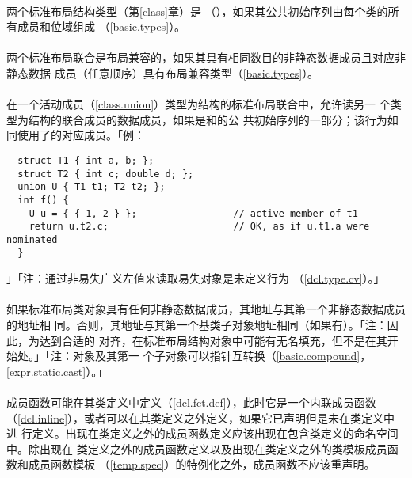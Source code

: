 \paragraph{}
两个标准布局结构类型（第\ref{class}章）是
（），如果其公共初始序列由每个类的所有成员和位域组成
（\ref{basic.types}）。

\paragraph{}
两个标准布局联合是布局兼容的，如果其具有相同数目的非静态数据成员且对应非静态数据
成员（任意顺序）具有布局兼容类型（\ref{basic.types}）。

\paragraph{}
在一个活动成员（\ref{class.union}）类型为结构的标准布局联合中，允许读另一
个类型为结构的联合成员的数据成员，如果是和的公
共初始序列的一部分；该行为如同使用了的对应成员。「例：
\begin{lstlisting}
  struct T1 { int a, b; };
  struct T2 { int c; double d; };
  union U { T1 t1; T2 t2; };
  int f() {
    U u = { { 1, 2 } };                 // active member of t1
    return u.t2.c;                      // OK, as if u.t1.a were nominated
  }
\end{lstlisting}」「注：通过非易失广义左值来读取易失对象是未定义行为
（\ref{dcl.type.cv}）。」

\paragraph{}
如果标准布局类对象具有任何非静态数据成员，其地址与其第一个非静态数据成员的地址相
同。否则，其地址与其第一个基类子对象地址相同（如果有）。「注：因此，为达到合适的
对齐，在标准布局结构对象中可能有无名填充，但不是在其开始处。」「注：对象及其第一
个子对象可以指针互转换（\ref{basic.compound}，\ref{expr.static.cast}）。」

\paragraph{}
成员函数可能在其类定义中定义（\ref{dcl.fct.def}），此时它是一个内联成员函数
（\ref{dcl.inline}），或者可以在其类定义之外定义，如果它已声明但是未在类定义中进
行定义。出现在类定义之外的成员函数定义应该出现在包含类定义的命名空间中。除出现在
类定义之外的成员函数定义以及出现在类定义之外的类模板成员函数和成员函数模板
（\ref{temp.spec}）的特例化之外，成员函数不应该重声明。

